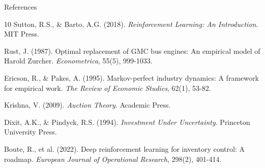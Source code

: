 \documentclass[10pt]{beamer}
\begin{document}
\begin{frame}[allowframebreaks]{References}
    \small
    \begin{thebibliography}{10}
         Sutton, R.S., \& Barto, A.G. (2018). \textit{Reinforcement Learning: An Introduction}. MIT Press.
        
         Rust, J. (1987). Optimal replacement of GMC bus engines: An empirical model of Harold Zurcher. \textit{Econometrica}, 55(5), 999-1033.
        
         Ericson, R., \& Pakes, A. (1995). Markov-perfect industry dynamics: A framework for empirical work. \textit{The Review of Economic Studies}, 62(1), 53-82.
        
         Krishna, V. (2009). \textit{Auction Theory}. Academic Press.
        
         Dixit, A.K., \& Pindyck, R.S. (1994). \textit{Investment Under Uncertainty}. Princeton University Press.
        
         Boute, R., et al. (2022). Deep reinforcement learning for inventory control: A roadmap. \textit{European Journal of Operational Research}, 298(2), 401-414.
    \end{thebibliography}
\end{frame}
\end{document}
